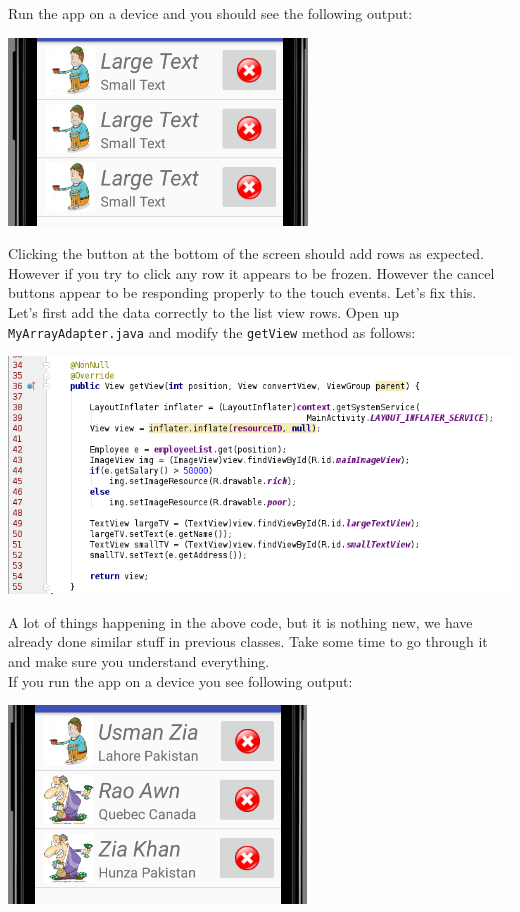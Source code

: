 Run the app on a device and you should see the following output:

\begin{center}
	\includegraphics[scale=0.4]{chapters/ch10/images/46}
\end{center}

Clicking the button at the bottom of the screen should add rows as expected. However if you try to click any row it appears to be frozen. However the cancel buttons appear to be responding properly to the touch events. Let's fix this. \\

Let's first add the data correctly to the list view rows. Open up \texttt{MyArrayAdapter.java} and modify the \texttt{getView} method as follows:

\begin{center}
	\includegraphics[scale=0.4]{chapters/ch10/images/47}
\end{center}

A lot of things happening in the above code, but it is nothing new, we have already done similar stuff in previous classes. Take some time to go through it and make sure you understand everything. \\

If you run the app on a device you see following output:

\begin{center}
	\includegraphics[scale=0.4]{chapters/ch10/images/48}
\end{center}

